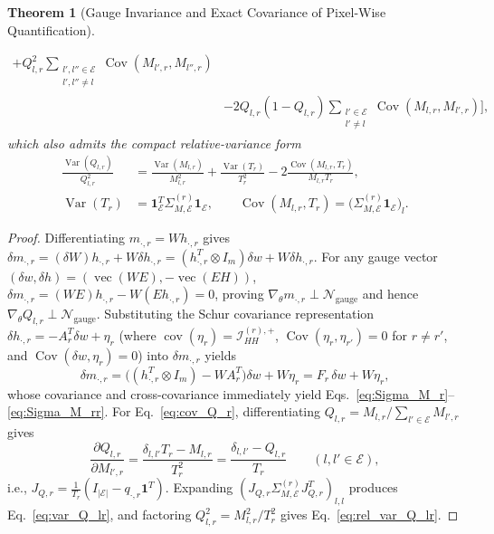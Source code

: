\documentclass[11pt,a4paper]{article}
\theoremstyle{plain}
\newtheorem{theorem}{Theorem}[section]
\theoremstyle{definition}
\theoremstyle{remark}
\newcommand{\E}{\mathcal{E}}
\newcommand{\cN}{\mathcal{N}}
\newcommand{\cI}{\mathcal{I}}
\newcommand{\vecop}{\operatorname{vec}}
\newcommand{\cov}{\operatorname{cov}}
\newcommand{\Var}{\operatorname{Var}}
\newcommand{\Cov}{\operatorname{Cov}}
\newcommand{\one}{\mathbf{1}}
\newcommand{\kron}{\otimes}
\begin{document}
\begin{theorem}[Gauge Invariance and Exact Covariance of Pixel-Wise Quantification]
\begin{enumerate}[leftmargin=1.5em]
\begin{equation}
\begin{aligned}
    + Q_{l,r}^2 \sum_{\substack{l', l'' \in \E \\ l', l'' \neq l}} \Cov(M_{l', r}, M_{l'', r}) \\
    &- 2 Q_{l,r}(1 - Q_{l,r}) \sum_{\substack{l' \in \E \\ l' \neq l}} \Cov(M_{l,r}, M_{l', r})
    \Bigg],
    \end{aligned}
    \end{equation}
    which also admits the compact relative-variance form
    \begin{equation}
    \label{eq:rel_var_Q_lr}
    \begin{aligned}
    \frac{\Var(Q_{l,r})}{Q_{l,r}^2} &= \frac{\Var(M_{l,r})}{M_{l,r}^2} + \frac{\Var(T_r)}{T_r^2} - 2 \frac{\Cov(M_{l,r}, T_r)}{M_{l,r} T_r}, \\
    \Var(T_r) &= \one_\E^T \Sigma_{M,\E}^{(r)} \one_\E,\qquad \Cov(M_{l,r}, T_r) = \big(\Sigma_{M,\E}^{(r)} \one_\E\big)_l.
    \end{aligned}
    \end{equation}
\end{enumerate}
\end{theorem}

\begin{proof}
Differentiating $m_{\cdot, r} = W h_{\cdot, r}$ gives $\delta m_{\cdot, r} = (\delta W) h_{\cdot, r} + W \delta h_{\cdot, r} = (h_{\cdot, r}^T \kron I_m)\delta w + W \delta h_{\cdot, r}$. For any gauge vector $(\delta w, \delta h) = (\vecop(WE), -\vecop(EH))$, $\delta m_{\cdot, r} = (WE)h_{\cdot, r} - W(E h_{\cdot, r}) = 0$, proving $\nabla_\theta m_{\cdot, r} \perp \cN_{\text{gauge}}$ and hence $\nabla_\theta Q_{l,r} \perp \cN_{\text{gauge}}$. Substituting the Schur covariance representation $\delta h_{\cdot, r} = -A_r^T \delta w + \eta_r$ (where $\cov(\eta_r) = \cI_{HH}^{(r),+}$, $\Cov(\eta_r, \eta_{r'}) = 0$ for $r \neq r'$, and $\Cov(\delta w, \eta_r) = 0$) into $\delta m_{\cdot, r}$ yields
\[
\delta m_{\cdot, r} = \big((h_{\cdot, r}^T \kron I_m) - W A_r^T\big) \delta w + W \eta_r = F_r \, \delta w + W \eta_r,
\]
whose covariance and cross-covariance immediately yield Eqs.~\eqref{eq:Sigma_M_r}--\eqref{eq:Sigma_M_rr}. For Eq.~\eqref{eq:cov_Q_r}, differentiating $Q_{l,r} = M_{l,r} / \sum_{l'\in\E} M_{l',r}$ gives
\[
\frac{\partial Q_{l,r}}{\partial M_{l',r}} = \frac{\delta_{l,l'} T_r - M_{l,r}}{T_r^2} = \frac{\delta_{l,l'} - Q_{l,r}}{T_r} \qquad (l, l' \in \E),
\]
i.e., $J_{Q,r} = \frac{1}{T_r}(I_{|\E|} - q_{\cdot, r}\one^T)$. Expanding $(J_{Q,r} \Sigma_{M,\E}^{(r)} J_{Q,r}^T)_{l,l}$ produces Eq.~\eqref{eq:var_Q_lr}, and factoring $Q_{l,r}^2 = M_{l,r}^2/T_r^2$ gives Eq.~\eqref{eq:rel_var_Q_lr}.
\end{proof}
\end{document}
